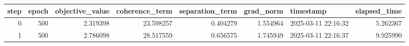 \begin{tabular}{rrrrrrlr}
\toprule
\toprule
\midrule
step & epoch & objective\_value & coherence\_term & separation\_term & grad\_norm & timestamp & elapsed\_time \\
\midrule
0 & 500 & 2.319398 & 23.598257 & 0.404279 & 1.554964 & 2025-03-11 22:16:32 & 5.262367 \\
1 & 500 & 2.786098 & 28.517559 & 0.656575 & 1.745949 & 2025-03-11 22:16:37 & 9.925990 \\
\bottomrule
\bottomrule
\end{tabular}